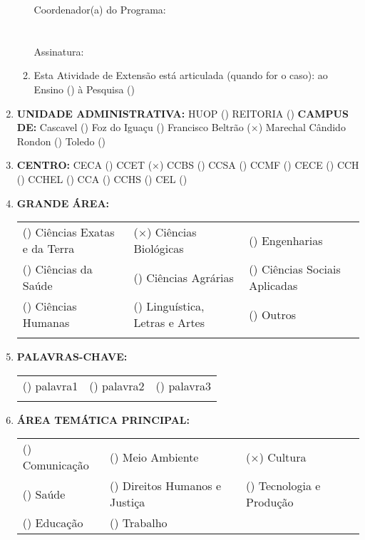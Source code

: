 \documentclass[12pt,a4paper,oneside]{article}%
\begin{document}
\begin{enumerate}
\begin{mdframed}[innertopmargin=5pt, innerleftmargin=3pt, innerrightmargin=3pt]
\begin{enumerate}
                Coordenador(a) do Programa: \\ \\ \\
                Assinatura: \hrulefill \\
\item%
Esta Atividade de Extensão está articulada (quando for o caso): ao Ensino () à Pesquisa ()%
\end{enumerate}%
\end{mdframed}%
\item%
\textbf{UNIDADE ADMINISTRATIVA: }%
HUOP () %
REITORIA () %
\newline%
\textbf{CAMPUS DE: }%
Cascavel () %
Foz do Iguaçu () %
Francisco Beltrão ($\times$) %
Marechal Cândido Rondon () %
Toledo () %
\item%
\textbf{CENTRO: }%
\newline%
CECA () %
CCET ($\times$) %
CCBS () %
CCSA () %
CCMF () %
CECE () %
CCH () %
CCHEL () %
CCA () %
CCHS () %
CEL () %
\item%
\textbf{GRANDE ÁREA: }%
\newline%
\begin{tabularx}{\linewidth}{|X|X|X|}%
\hline%
() Ciências Exatas e da Terra&($\times$) Ciências Biológicas&() Engenharias\\%
() Ciências da Saúde&() Ciências Agrárias&() Ciências Sociais Aplicadas\\%
() Ciências Humanas&() Linguística, Letras e Artes&() Outros\\%
&&\\%
\hline%
\end{tabularx}%
\item%
\textbf{PALAVRAS{-}CHAVE: }%
\newline%
\begin{tabularx}{\linewidth}{|X|X|X|}%
\hline%
() palavra1&() palavra2&() palavra3\\%
&&\\%
\hline%
\end{tabularx}%
\item%
\textbf{ÁREA TEMÁTICA PRINCIPAL: }%
\newline%
\begin{tabularx}{\linewidth}{|X|X|X|}%
\hline%
() Comunicação&() Meio Ambiente&($\times$) Cultura\\%
() Saúde&() Direitos Humanos e Justiça&() Tecnologia e Produção\\%
() Educação&() Trabalho&\\%
\hline%
\end{tabularx}%

\end{enumerate}
\end{document}
